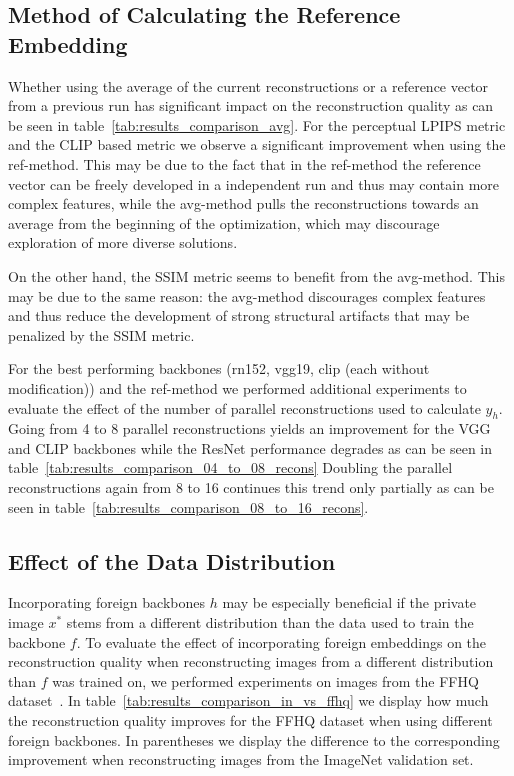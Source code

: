 \documentclass[10pt,twocolumn]{article}
\begin{document}
\subsection{Method of Calculating the Reference Embedding}
Whether using the average of the current reconstructions or a reference vector from a previous run has significant impact on the reconstruction quality as can be seen in table~\ref{tab:results_comparison_avg}.
For the perceptual LPIPS metric and the CLIP based metric we observe a significant improvement when using the ref-method.
This may be due to the fact that in the ref-method the reference vector can be freely developed in a independent run and thus may contain more complex features, while the avg-method pulls the reconstructions towards an average from the beginning of the optimization, which may discourage exploration of more diverse solutions.

On the other hand, the SSIM metric seems to benefit from the avg-method.
This may be due to the same reason: the avg-method discourages complex features and thus reduce the development of strong structural artifacts that may be penalized by the SSIM metric.

For the best performing backbones (rn152, vgg19, clip (each without modification)) and the ref-method we performed additional experiments to evaluate the effect of the number of parallel reconstructions used to calculate $y_h$.
Going from 4 to 8 parallel reconstructions yields an improvement for the VGG and CLIP backbones while the ResNet performance degrades as can be seen in table~\ref{tab:results_comparison_04_to_08_recons}
Doubling the parallel reconstructions again from 8 to 16 continues this trend only partially as can be seen in table~\ref{tab:results_comparison_08_to_16_recons}.

\subsection{Effect of the Data Distribution}
Incorporating foreign backbones $h$ may be especially beneficial if the private image $x^*$ stems from a different distribution than the data used to train the backbone $f$.
To evaluate the effect of incorporating foreign embeddings on the reconstruction quality when reconstructing images from a different distribution than $f$ was trained on, we performed experiments on images from the FFHQ dataset~\cite{karras2019style}.
In table~\ref{tab:results_comparison_in_vs_ffhq} we display how much the reconstruction quality improves for the FFHQ dataset when using different foreign backbones.
In parentheses we display the difference to the corresponding improvement when reconstructing images from the ImageNet validation set.
\end{document}
